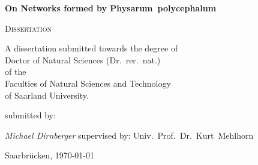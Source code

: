 
\begin{titlepage}
	\centering
	\vfill



	{\huge\bfseries On Networks formed by Physarum~polycephalum}
	\vfill

	{\scshape\Large Dissertation}
	\vfill



	{\large A dissertation submitted towards the degree of\\ 
	Doctor of Natural Sciences (Dr.~rer.~nat.)\\
	of the\\
	Faculties of Natural Sciences and Technology\\
	of Saarland University.}
	
	\vfill
	submitted by:
	\vfill

	{\Large\itshape Michael Dirnberger}
	\vfill
	supervised by:
	\vfill
	Univ.~Prof.~Dr.~Kurt~Mehlhorn

	\vfill

	{\large Saarbr\"ucken, \today}
\end{titlepage}